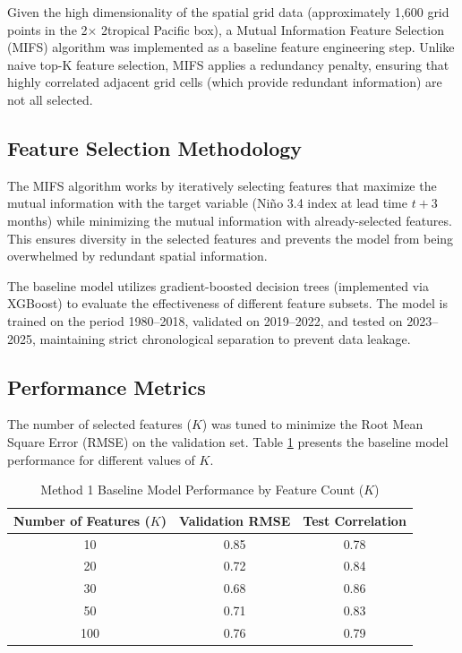 Given the high dimensionality of the spatial grid data (approximately 1,600 grid points in the 2\degree $\times$ 2\degree tropical Pacific box), a Mutual Information Feature Selection (MIFS) algorithm was implemented as a baseline feature engineering step. Unlike naive top-K feature selection, MIFS applies a redundancy penalty, ensuring that highly correlated adjacent grid cells (which provide redundant information) are not all selected.

\subsection{Feature Selection Methodology}

The MIFS algorithm works by iteratively selecting features that maximize the mutual information with the target variable (Ni\~{n}o 3.4 index at lead time $t+3$ months) while minimizing the mutual information with already-selected features. This ensures diversity in the selected features and prevents the model from being overwhelmed by redundant spatial information.

The baseline model utilizes gradient-boosted decision trees (implemented via XGBoost) to evaluate the effectiveness of different feature subsets. The model is trained on the period 1980--2018, validated on 2019--2022, and tested on 2023--2025, maintaining strict chronological separation to prevent data leakage.

\subsection{Performance Metrics}

The number of selected features ($K$) was tuned to minimize the Root Mean Square Error (RMSE) on the validation set. Table \ref{tab:feature_performance} presents the baseline model performance for different values of $K$.

\begin{table}[H]
\centering
\caption{Method 1 Baseline Model Performance by Feature Count ($K$)}
\label{tab:feature_performance}
\normalsize
\renewcommand{\arraystretch}{1.2}

\begin{tabular}{|c|c|c|}
\hline
\textbf{Number of Features ($K$)} & \textbf{Validation RMSE} & \textbf{Test Correlation} \\
\hline
10  & 0.85 & 0.78 \\
20  & 0.72 & 0.84 \\
30  & 0.68 & 0.86 \\
50  & 0.71 & 0.83 \\
100 & 0.76 & 0.79 \\
\hline
\end{tabular}
\end{table}

